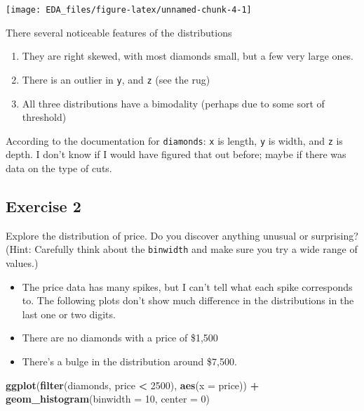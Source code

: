 \documentclass[]{book}
\newenvironment{Shaded}{\begin{snugshade}}{\end{snugshade}}
\newcommand{\DataTypeTok}[1]{\textcolor[rgb]{0.13,0.29,0.53}{#1}}
\newcommand{\DecValTok}[1]{\textcolor[rgb]{0.00,0.00,0.81}{#1}}
\newcommand{\KeywordTok}[1]{\textcolor[rgb]{0.13,0.29,0.53}{\textbf{#1}}}
\newcommand{\NormalTok}[1]{#1}
\newcommand{\OperatorTok}[1]{\textcolor[rgb]{0.81,0.36,0.00}{\textbf{#1}}}
\newcommand{\StringTok}[1]{\textcolor[rgb]{0.31,0.60,0.02}{#1}}
\providecommand{\tightlist}{%
  \setlength{\itemsep}{0pt}\setlength{\parskip}{0pt}}
\theoremstyle{plain}
\theoremstyle{remark}
\theoremstyle{definition}
\theoremstyle{definition}
\theoremstyle{definition}
\theoremstyle{remark}
\begin{document}
\begin{center}\texttt{[image: EDA\_files/figure-latex/unnamed-chunk-4-1]} \end{center}

There several noticeable features of the distributions

\begin{enumerate}
\def\labelenumi{\arabic{enumi}.}
\tightlist
\item
  They are right skewed, with most diamonds small, but a few very large
  ones.
\item
  There is an outlier in \texttt{y}, and \texttt{z} (see the rug)
\item
  All three distributions have a bimodality (perhaps due to some sort of
  threshold)
\end{enumerate}

According to the documentation for \texttt{diamonds}: \texttt{x} is
length, \texttt{y} is width, and \texttt{z} is depth. I don't know if I
would have figured that out before; maybe if there was data on the type
of cuts.

\hypertarget{exercise-2-12}{%
\subsection{Exercise 2}\label{exercise-2-12}}

Explore the distribution of price. Do you discover anything unusual or
surprising? (Hint: Carefully think about the \texttt{binwidth} and make
sure you try a wide range of values.)

\begin{itemize}
\tightlist
\item
  The price data has many spikes, but I can't tell what each spike
  corresponds to. The following plots don't show much difference in the
  distributions in the last one or two digits.
\item
  There are no diamonds with a price of \$1,500
\item
  There's a bulge in the distribution around \$7,500.
\end{itemize}

\begin{Shaded}
\begin{Highlighting}[]
\KeywordTok{ggplot}\NormalTok{(}\KeywordTok{filter}\NormalTok{(diamonds, price }\OperatorTok{<}\StringTok{ }\DecValTok{2500}\NormalTok{), }\KeywordTok{aes}\NormalTok{(}\DataTypeTok{x =}\NormalTok{ price)) }\OperatorTok{+}
\StringTok{  }\KeywordTok{geom_histogram}\NormalTok{(}\DataTypeTok{binwidth =} \DecValTok{10}\NormalTok{, }\DataTypeTok{center =} \DecValTok{0}\NormalTok{)}
\end{Highlighting}
\end{Shaded}
\end{document}
